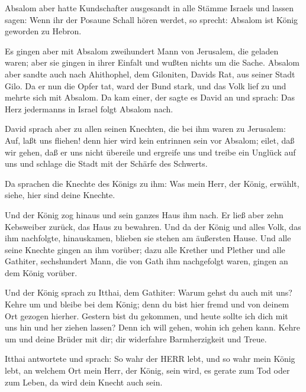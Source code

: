  Absalom aber hatte Kundschafter ausgesandt in alle Stämme
Israels und lassen sagen: Wenn ihr der Posaune Schall hören werdet, so
sprecht: Absalom ist König geworden zu Hebron.

 Es gingen aber mit Absalom zweihundert Mann von Jerusalem,
die geladen waren; aber sie gingen in ihrer Einfalt und wußten nichts um
die Sache.  Absalom aber sandte auch nach Ahithophel, dem
Giloniten, Davids Rat, aus seiner Stadt Gilo. Da er nun die Opfer tat,
ward der Bund stark, und das Volk lief zu und mehrte sich mit Absalom.
 Da kam einer, der sagte es David an und sprach: Das Herz
jedermanns in Israel folgt Absalom nach.

 David sprach aber zu allen seinen Knechten, die bei ihm
waren zu Jerusalem: Auf, laßt uns fliehen! denn hier wird kein entrinnen
sein vor Absalom; eilet, daß wir gehen, daß er uns nicht übereile und
ergreife uns und treibe ein Unglück auf uns und schlage die Stadt mit
der Schärfe des Schwerts.

 Da sprachen die Knechte des Königs zu ihm: Was mein Herr,
der König, erwählt, siehe, hier sind deine Knechte.

 Und der König zog hinaus und sein ganzes Haus ihm nach. Er
ließ aber zehn Kebsweiber zurück, das Haus zu bewahren. 
Und da der König und alles Volk, das ihm nachfolgte, hinauskamen,
blieben sie stehen am äußersten Hause.  Und alle seine
Knechte gingen an ihm vorüber; dazu alle Krether und Plether und alle
Gathiter, sechshundert Mann, die von Gath ihm nachgefolgt waren, gingen
an dem König vorüber.

 Und der König sprach zu Itthai, dem Gathiter: Warum gehst
du auch mit uns? Kehre um und bleibe bei dem König; denn du bist hier
fremd und von deinem Ort gezogen hierher.  Gestern bist du
gekommen, und heute sollte ich dich mit uns hin und her ziehen lassen?
Denn ich will gehen, wohin ich gehen kann. Kehre um und deine Brüder mit
dir; dir widerfahre Barmherzigkeit und Treue.

 Itthai antwortete und sprach: So wahr der HERR lebt, und
so wahr mein König lebt, an welchem Ort mein Herr, der König, sein wird,
es gerate zum Tod oder zum Leben, da wird dein Knecht auch sein.

